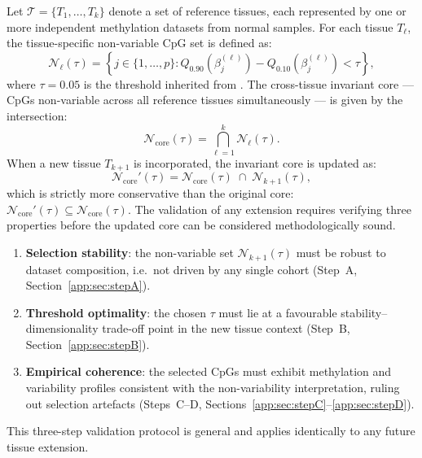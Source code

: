 Let $\mathcal{T} = \{T_1, \dots, T_k\}$ denote a set of reference 
tissues, each represented by one or more independent methylation 
datasets from normal samples. For each tissue $T_\ell$, the 
tissue-specific non-variable CpG set is defined as:
\begin{equation}
    \mathcal{N}_\ell(\tau)
    =
    \left\{
    j \in \{1,\dots,p\} :
    Q_{0.90}\!\left(\beta_j^{(\ell)}\right)
    -
    Q_{0.10}\!\left(\beta_j^{(\ell)}\right)
    < \tau
    \right\},
    \label{eq:nv_tissue}
\end{equation}
where $\tau = 0.05$ is the threshold inherited from 
\cite{Edgar2017}. The cross-tissue invariant core — CpGs 
non-variable across all reference tissues simultaneously — is 
given by the intersection:
\begin{equation}
    \mathcal{N}_{\mathrm{core}}(\tau)
    =
    \bigcap_{\ell=1}^{k} \mathcal{N}_\ell(\tau).
    \label{eq:nv_core}
\end{equation}
When a new tissue $T_{k+1}$ is incorporated, the invariant 
core is updated as:
\begin{equation}
    \mathcal{N}_{\mathrm{core}}'(\tau)
    =
    \mathcal{N}_{\mathrm{core}}(\tau)
    \;\cap\;
    \mathcal{N}_{k+1}(\tau),
    \label{eq:nv_update}
\end{equation}
which is strictly more conservative than the original core: 
$\mathcal{N}_{\mathrm{core}}'(\tau) \subseteq 
\mathcal{N}_{\mathrm{core}}(\tau)$.
The validation of any extension requires verifying three 
properties before the updated core can be considered 
methodologically sound.
\begin{enumerate}
    \item \textbf{Selection stability}: the non-variable set 
    $\mathcal{N}_{k+1}(\tau)$ must be robust to dataset 
    composition, i.e.\ not driven by any single cohort 
    (Step~A, Section~\ref{app:sec:stepA}).
    \item \textbf{Threshold optimality}: the chosen $\tau$ 
    must lie at a favourable stability--dimensionality 
    trade-off point in the new tissue context 
    (Step~B, Section~\ref{app:sec:stepB}).
    \item \textbf{Empirical coherence}: the selected CpGs 
    must exhibit methylation and variability profiles 
    consistent with the non-variability interpretation, 
    ruling out selection artefacts 
    (Steps~C--D, Sections~\ref{app:sec:stepC}--\ref{app:sec:stepD}).
\end{enumerate}
This three-step validation protocol is general and applies 
identically to any future tissue extension.

